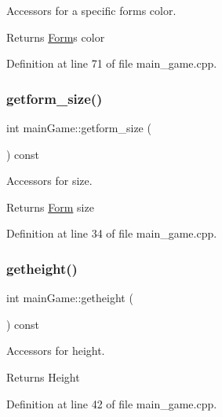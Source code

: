 Accessors for a specific form\textquotesingle{}s color. 

\begin{DoxyReturn}{Returns}
\hyperlink{class_form}{Form}\textquotesingle{}s color 
\end{DoxyReturn}


Definition at line 71 of file main\+\_\+game.\+cpp.

\hypertarget{classmain_game_aa756b9ac462f108586efc8b846cc577c}{}\label{classmain_game_aa756b9ac462f108586efc8b846cc577c} 
\subsubsection{\texorpdfstring{getform\+\_\+size()}{getform\_size()}}
{\footnotesize\ttfamily int main\+Game\+::getform\+\_\+size (\begin{DoxyParamCaption}{ }\end{DoxyParamCaption}) const}



Accessors for size. 

\begin{DoxyReturn}{Returns}
\hyperlink{class_form}{Form} size 
\end{DoxyReturn}


Definition at line 34 of file main\+\_\+game.\+cpp.

\hypertarget{classmain_game_ae346d0d0edeabaaf2fab2dd1049bbc86}{}\label{classmain_game_ae346d0d0edeabaaf2fab2dd1049bbc86} 
\subsubsection{\texorpdfstring{getheight()}{getheight()}}
{\footnotesize\ttfamily int main\+Game\+::getheight (\begin{DoxyParamCaption}{ }\end{DoxyParamCaption}) const}



Accessors for height. 

\begin{DoxyReturn}{Returns}
Height 
\end{DoxyReturn}


Definition at line 42 of file main\+\_\+game.\+cpp.

\hypertarget{classmain_game_a4991a14c51d954adc65fbef4a0235a89}{}\label{classmain_game_a4991a14c51d954adc65fbef4a0235a89} 
